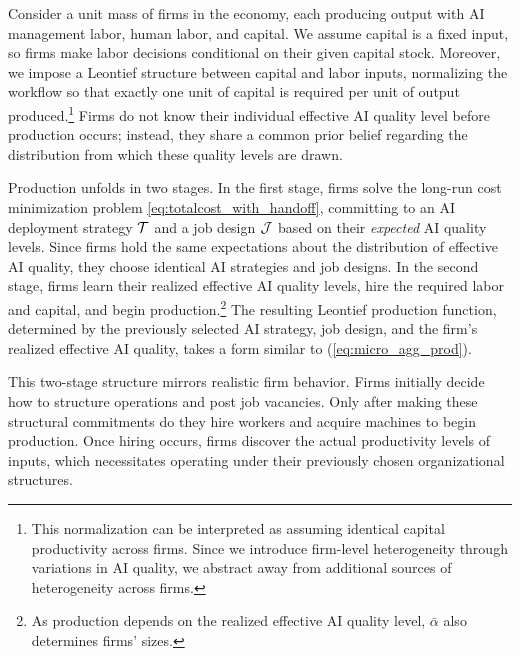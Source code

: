 Consider a unit mass of firms in the economy, each producing output with AI management labor, human labor, and capital.
We assume capital is a fixed input, so firms make labor decisions conditional on their given capital stock.
Moreover, we impose a Leontief structure between capital and labor inputs, normalizing the workflow so that exactly one unit of capital is required per unit of output produced.\footnote{This normalization can be interpreted as assuming identical capital productivity across firms. Since we introduce firm-level heterogeneity through variations in AI quality, we abstract away from additional sources of heterogeneity across firms.} 
Firms do not know their individual effective AI quality level before production occurs; instead, they share a common prior belief regarding the distribution from which these quality levels are drawn.

Production unfolds in two stages.
In the first stage, firms solve the long-run cost minimization problem \eqref{eq:totalcost_with_handoff}, committing to an AI deployment strategy $\mathcal{T}$ and a job design $\mathcal{J}$ based on their \emph{expected} AI quality levels.
Since firms hold the same expectations about the distribution of effective AI quality, they choose identical AI strategies and job designs.
In the second stage, firms learn their realized effective AI quality levels, hire the required labor and capital, and begin production.\footnote{As production depends on the realized effective AI quality level, $\bar{\alpha}$ also determines firms' sizes.}
The resulting Leontief production function, determined by the previously selected AI strategy, job design, and the firm's realized effective AI quality, takes a form similar to (\ref{eq:micro_agg_prod}).

This two-stage structure mirrors realistic firm behavior.
Firms initially decide how to structure operations and post job vacancies.
Only after making these structural commitments do they hire workers and acquire machines to begin production.
Once hiring occurs, firms discover the actual productivity levels of inputs, which necessitates operating under their previously chosen organizational structures.


